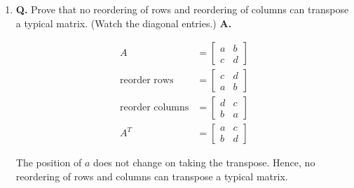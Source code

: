 \documentclass[main.tex]{subfiles}
\begin{document}
\begin{enumerate}
    Symmetric block matrix
    
    $$
    \begin{aligned}
    M &= M^{T} \\
    {\left[\begin{array}{ll}
    A & B \\
    C & D
    \end{array}\right] &= \left[\begin{array}{ll}
    A^{T} & C^{T} \\
    B^{T} & D^{T}
    \end{array}\right]}\\
    A&=A^{T}\\
    B&=C^{T}\\
    C&=B^{T}\\
    D&=D^{T}\\
    \end{aligned}
    $$
    
    \item [29.] \textbf{Q.} Prove that no reordering of rows and reordering of columns can transpose a typical matrix. (Watch the diagonal entries.) \textbf{A.}
    
    $$
    \begin{aligned}
    A &= \left[\begin{array}{ll}
    a & b \\
    c & d
    \end{array}\right]\\
    \text{reorder rows} & = \left[\begin{array}{ll}
    c & d \\
    a & b
    \end{array}\right]\\
    \text{reorder columns} & = \left[\begin{array}{ll}
    d & c \\
    b & a
    \end{array}\right]\\
    A^{T} &= \left[\begin{array}{ll}
    a & c \\
    b & d
    \end{array}\right]
    \end{aligned}
    $$
    
    The position of $a$ does not change on taking the transpose. Hence, no reordering of rows and columns can transpose a typical matrix.
    
\end{enumerate}
\end{document}

